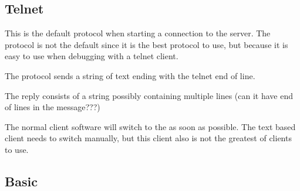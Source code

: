 \subsection{Telnet}
\label{protocol:telnet}

This is the default protocol when starting a connection to the server. The
protocol is not the default since it is the best protocol to use, but
because it is easy to use when debugging with a telnet client.

The protocol sends a string of text ending with the telnet end of line.

The reply consists of a string possibly containing multiple lines
(can it have end of lines in the message???)

The normal client software will switch to the  as
soon as possible. The text based client needs to switch manually, but this
client also is not the greatest of clients to use.

\subsection{Basic}
\label{protocol:basic}

